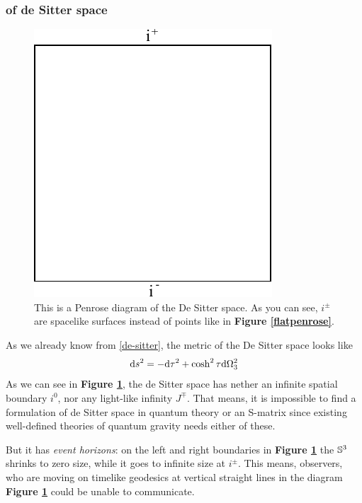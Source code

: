 	\subsubsection{of de Sitter space \checkmark}
	\begin{figure}[tbp]
	 	\begin{center}
			\includegraphics[scale=0.8]{dspenrose}
		\end{center}
	  		\caption{This is a Penrose diagram of the De Sitter space. As you can see, $i^{\pm}$ are spacelike surfaces instead of points like in \textbf{Figure \ref{flatpenrose}}.}\label{dspenrose}
	\end{figure}
	As we already know from \eqref{de-sitter}, the metric of the De Sitter space looks like
		\begin{equation}
			\mathrm{d} s^2=- \mathrm{d} \tau^2+\cosh^2\tau \mathrm{d} \Omega^2_3
		\end{equation}
	As we can see in \textbf{Figure \ref{dspenrose}}, the de Sitter space has nether an infinite spatial boundary $i^0$, nor any light-like infinity $J^\mp$. That means, it is impossible to find a formulation of de Sitter space in quantum theory or an S-matrix since existing well-defined theories of quantum gravity needs either of these. 
		
	But it has \textit{event horizons}: on the left and right boundaries in \textbf{Figure \ref{dspenrose}} the $\mathbb{S}^3$ shrinks to zero size, while it goes to infinite size at $i^{\pm}$. This means, observers, who are moving on timelike geodesics at vertical straight lines in the diagram \textbf{Figure \ref{dspenrose}} could be unable to communicate.
	 
